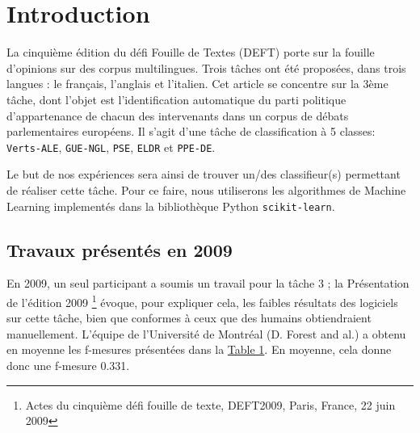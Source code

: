 \section{Introduction}

\par La cinquième édition du défi Fouille de Textes (DEFT) porte sur la fouille d'opinions sur des corpus multilingues. Trois tâches ont été proposées,
dans trois langues : le français, l'anglais et l'italien. Cet article se concentre sur la 3ème tâche, dont l'objet est l'identification automatique
du parti politique d'appartenance de chacun des intervenants dans un corpus de débats parlementaires européens. Il s'agit d'une tâche de classification à 5 classes:
\texttt{Verts-ALE}, \texttt{GUE-NGL}, \texttt{PSE}, \texttt{ELDR} et \texttt{PPE-DE}.

\par Le but de nos expériences sera ainsi de trouver un/des classifieur(s) permettant de réaliser cette tâche. Pour ce faire, nous utiliserons les algorithmes
de Machine Learning implementés dans la bibliothèque Python \texttt{scikit-learn}.

\subsection{Travaux présentés en 2009}




\begin{table}[h!]
\centering
\setlength{\tabcolsep}{5pt} %
\renewcommand{\arraystretch}{1.2} %
\caption{Moyennes des F-mesures par parti politique.}
\label{tab:moyennes_fmesures}
\end{table}


\par En 2009, un seul participant a soumis un travail pour la tâche 3 ; la Présentation de l'édition 2009 \footnote{Actes du cinquième défi fouille de texte, DEFT2009, Paris, France, 22 juin 2009} évoque, pour expliquer cela, les faibles résultats des logiciels sur cette tâche, bien que conformes à ceux que des humains obtiendraient manuellement. L'équipe de l'Université de Montréal (D. Forest and al.) a obtenu en moyenne les f-mesures présentées dans la \hyperref[tab:moyennes_fmesures]{Table 1}. En moyenne, cela donne donc une f-mesure 0.331.

